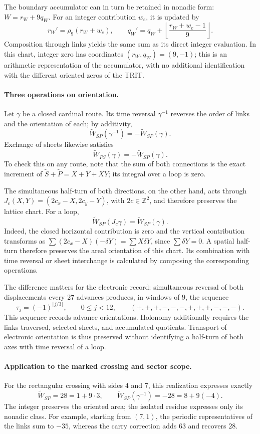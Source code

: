 The boundary accumulator can in turn be retained in nonadic form:
$W=r_W+9q_W$. For an integer contribution $w_e$, it is updated by
\[
 r_W'=\rho_9(r_W+w_e),\qquad
 q_W'=q_W+\left\lfloor\frac{r_W+w_e-1}{9}\right\rfloor.
\]
Composition through links yields the same sum as its direct integer evaluation. In this chart, integer zero has coordinates $(r_W,q_W)=(9,-1)$; this is an arithmetic representation of the accumulator, with no additional identification with the different oriented zeros of the TRIT.

\paragraph{Three operations on orientation.}
Let $\gamma$ be a closed cardinal route. Its time reversal
$\gamma^{-1}$ reverses the order of links and the orientation of each;
by additivity,
\[
 \widetilde W_{SP}(\gamma^{-1})=-\widetilde W_{SP}(\gamma).
\]
Exchange of sheets likewise satisfies
\[
 \widetilde W_{PS}(\gamma)=-\widetilde W_{SP}(\gamma).
\]
To check this on any route, note that the sum of both
connections is the exact increment of
$\widetilde S+\widetilde P=X+Y+XY$; its integral over a loop is zero.

The simultaneous half-turn of both directions, on the other hand, acts through $J_c(X,Y)=(2c_x-X,2c_y-Y)$, with $2c\in\mathbb Z^2$, and therefore preserves the lattice chart. For a loop,
\[
 \widetilde W_{SP}(J_c\gamma)=\widetilde W_{SP}(\gamma).
\]
Indeed, the closed horizontal contribution is zero and the vertical contribution transforms as $\sum (2c_x-X)(-\delta Y)=\sum X\delta Y$, since $\sum\delta Y=0$. A spatial half-turn therefore preserves the areal orientation of this chart. Its combination with time reversal or sheet interchange is calculated by composing the corresponding operations.

The difference matters for the electronic record: simultaneous reversal
of both displacements every $27$ advances produces, in
windows of $9$, the sequence
\[
 \tau_j=(-1)^{\lfloor j/3\rfloor},\qquad 0\leq j<12,
 \qquad (+,+,+,-,-,-,+,+,+,-,-,-).
\]
This sequence records advance orientations. Holonomy additionally requires
the links traversed, selected sheets, and accumulated
quotients. Transport of electronic orientation is thus preserved
without identifying a half-turn of both axes with time reversal
of a loop.

\paragraph{Application to the marked crossing and sector scope.}
For the rectangular crossing with sides $4$ and $7$, this realization expresses exactly
\[
 \widetilde W_{SP}=28=1+9\cdot3,\qquad
 \widetilde W_{SP}(\gamma^{-1})=-28=8+9(-4).
\]
The integer preserves the oriented area; the isolated residue expresses only its nonadic class. For example, starting from $(7,1)$, the periodic representatives of the links sum to $-35$, whereas the carry correction adds $63$ and recovers $28$.

